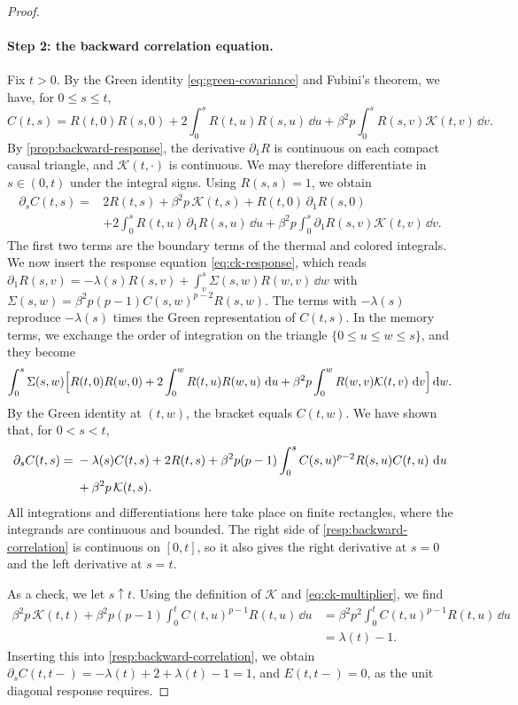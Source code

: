 \begin{proof}
\paragraph{Step 2: the backward correlation equation.}
Fix $t>0$. By the Green identity \eqref{eq:green-covariance} and Fubini's theorem, we have, for $0\le s\le t$,
\[
 C(t,s)=R(t,0)R(s,0)+2\int_0^sR(t,u)R(s,u)\,\dd u+\beta^2p\int_0^sR(s,v)\mathcal K(t,v)\,\dd v.
\]
By \cref{prop:backward-response}, the derivative $\partial_1R$ is continuous on each compact causal triangle, and $\mathcal K(t,\cdot)$ is continuous. We may therefore differentiate in $s\in(0,t)$ under the integral signs. Using $R(s,s)=1$, we obtain
\begin{align*}
 \partial_sC(t,s)={}&2R(t,s)+\beta^2p\,\mathcal K(t,s)+R(t,0)\,\partial_1R(s,0)\\
 &+2\int_0^sR(t,u)\,\partial_1R(s,u)\,\dd u+\beta^2p\int_0^s\partial_1R(s,v)\mathcal K(t,v)\,\dd v.
\end{align*}
The first two terms are the boundary terms of the thermal and colored integrals. We now insert the response equation \eqref{eq:ck-response}, which reads $\partial_1R(s,v)=-\lambda(s)R(s,v)+\int_v^s\Sigma(s,w)R(w,v)\,\dd w$ with $\Sigma(s,w)=\beta^2p(p-1)C(s,w)^{p-2}R(s,w)$. The terms with $-\lambda(s)$ reproduce $-\lambda(s)$ times the Green representation of $C(t,s)$. In the memory terms, we exchange the order of integration on the triangle $\{0\le u\le w\le s\}$, and they become
\[
 \int_0^s\Sigma(s,w)\Bigl[R(t,0)R(w,0)+2\int_0^wR(t,u)R(w,u)\,\mathop{}\!\mathrm d u+\beta^2p\int_0^wR(w,v)\mathcal K(t,v)\,\mathop{}\!\mathrm d v\Bigr]\mathop{}\!\mathrm d w.
\]
By the Green identity at $(t,w)$, the bracket equals $C(t,w)$. We have shown that, for $0<s<t$,
\begin{align}
 \partial_sC(t,s)={}&-\lambda(s)C(t,s)+2R(t,s)
       +\beta^2p(p-1)\int_0^s
          C(s,u)^{p-2}R(s,u)C(t,u)\,\mathop{}\!\mathrm d u\notag\\
       &+\beta^2p\,\mathcal K(t,s).
 \label{resp:backward-correlation}
\end{align}
All integrations and differentiations here take place on finite rectangles, where the integrands are continuous and bounded. The right side of \eqref{resp:backward-correlation} is continuous on $[0,t]$, so it also gives the right derivative at $s=0$ and the left derivative at $s=t$.

As a check, we let $s\uparrow t$. Using the definition of $\mathcal K$ and \eqref{eq:ck-multiplier}, we find
\[
\begin{aligned}
 \beta^2p\,\mathcal K(t,t)+\beta^2p(p-1)\int_0^tC(t,u)^{p-1}R(t,u)\,\dd u
 &=\beta^2p^2\int_0^tC(t,u)^{p-1}R(t,u)\,\dd u\\
 &=\lambda(t)-1.
\end{aligned}
\]
Inserting this into \eqref{resp:backward-correlation}, we obtain $\partial_sC(t,t-)=-\lambda(t)+2+\lambda(t)-1=1$, and $E(t,t-)=0$, as the unit diagonal response requires.


\end{proof}
